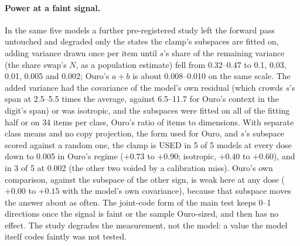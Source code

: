 \documentclass{article}
\begin{document}
\paragraph{Power at a faint signal.} In the same five models a further pre-registered study left the forward pass untouched and degraded only the states the clamp's subspaces are fitted on, adding variance drawn once per item until $s$'s share of the remaining variance (the share swap's $N$, as a population estimate) fell from 0.32--0.47 to 0.1, 0.03, 0.01, 0.005 and 0.002; Ouro's $a+b$ is about 0.008--0.010 on the same scale. The added variance had the covariance of the model's own residual (which crowds $s$'s span at 2.5--5.5 times the average, against 6.5--11.7 for Ouro's context in the digit's span) or was isotropic, and the subspaces were fitted on all of the fitting half or on 34 items per class, Ouro's ratio of items to dimensions. With separate class means and no copy projection, the form used for Ouro, and $s$'s subspace scored against a random one, the clamp is USED in 5 of 5 models at every dose down to 0.005 in Ouro's regime ($+0.73$ to $+0.90$; isotropic, $+0.40$ to $+0.60$), and in 3 of 5 at 0.002 (the other two voided by a calibration miss). Ouro's own comparison, against the subspace of the other sign, is weak here at any dose ($+0.00$ to $+0.15$ with the model's own covariance), because that subspace moves the answer about as often. The joint-code form of the main test keeps 0--1 directions once the signal is faint or the sample Ouro-sized, and then has no effect. The study degrades the measurement, not the model: a value the model itself codes faintly was not tested.
\end{document}
